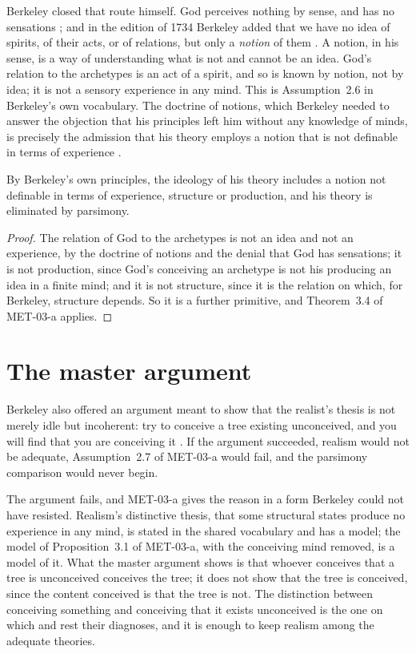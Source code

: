 \documentclass{situationist-preprint}
\begin{document}
Berkeley closed that route himself. God perceives nothing by sense, and has no sensations \citep[third dialogue]{BerkeleyDialogues}; and in the edition of 1734 Berkeley added that we have no idea of spirits, of their acts, or of relations, but only a \emph{notion} of them \citep[\S\S 27, 89, 142]{BerkeleyPrinciples}. A notion, in his sense, is a way of understanding what is not and cannot be an idea. God's relation to the archetypes is an act of a spirit, and so is known by notion, not by idea; it is not a sensory experience in any mind. This is Assumption~2.6 in Berkeley's own vocabulary. The doctrine of notions, which Berkeley needed to answer the objection that his principles left him without any knowledge of minds, is precisely the admission that his theory employs a notion that is not definable in terms of experience \citep{Winkler1989}.

\begin{corollary}\label{c:berkeley}
By Berkeley's own principles, the ideology of his theory includes a notion not definable in terms of experience, structure or production, and his theory is eliminated by parsimony.
\end{corollary}

\begin{proof}
The relation of God to the archetypes is not an idea and not an experience, by the doctrine of notions and the denial that God has sensations; it is not production, since God's conceiving an archetype is not his producing an idea in a finite mind; and it is not structure, since it is the relation on which, for Berkeley, structure depends. So it is a further primitive, and Theorem~3.4 of MET-03-a applies.
\end{proof}

\section{The master argument}

Berkeley also offered an argument meant to show that the realist's thesis is not merely idle but incoherent: try to conceive a tree existing unconceived, and you will find that you are conceiving it \citep[\S 23]{BerkeleyPrinciples}. If the argument succeeded, realism would not be adequate, Assumption~2.7 of MET-03-a would fail, and the parsimony comparison would never begin.

The argument fails, and MET-03-a gives the reason in a form Berkeley could not have resisted. Realism's distinctive thesis, that some structural states produce no experience in any mind, is stated in the shared vocabulary and has a model; the model of Proposition~3.1 of MET-03-a, with the conceiving mind removed, is a model of it. What the master argument shows is that whoever conceives that a tree is unconceived conceives the tree; it does not show that the tree is conceived, since the content conceived is that the tree is not. The distinction between conceiving something and conceiving that it exists unconceived is the one on which \citet{Prior1955} and \citet{Pitcher1977} rest their diagnoses, and it is enough to keep realism among the adequate theories.
\end{document}
